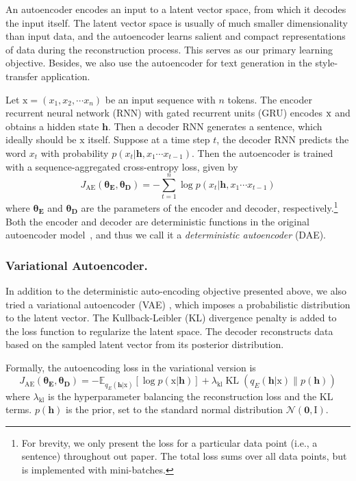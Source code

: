 \documentclass[letterpaper]{article} %
\newcommand{\rmx}{\mathrm x}
\newcommand{\loss}[1]{J_{\text{#1}}}
\newcommand{\hyp}[1]{\lambda_{\text{#1}}}
\newcommand{\nnweight}[1]{\bm{\theta_{\text{#1}}}}
\begin{document}
An autoencoder encodes an input to a latent vector space, from which it decodes the input itself. The latent vector space is usually of much smaller dimensionality than input data, and the autoencoder learns salient and compact representations of data during the reconstruction process.
This serves as our primary learning objective.
Besides, we also use the autoencoder for text generation in the style-transfer application.

Let $\rmx=(x_1, x_2, \cdots x_n)$ be an input sequence with $n$ tokens.
The encoder recurrent neural network (RNN) with gated recurrent units (GRU) \cite{cho2014learning} encodes $\rm x$ and obtains a hidden state $\bm h$.
Then a decoder RNN generates a sentence, which ideally should be $\rmx$ itself.
Suppose at a time step $t$, the decoder RNN predicts the word $x_t$ with probability $p(x_t|\bm h, x_1\cdots x_{t-1})$. Then the autoencoder is trained with a sequence-aggregated cross-entropy loss, given by
\begin{equation}
	\loss{AE}(\nnweight{E},\nnweight{D})= -\sum_{t=1}^n \log p(x_t|\bm h, x_1\cdots x_{t-1})
\end{equation}
where $\nnweight{E}$ and $\nnweight{D}$ are the parameters of the encoder and decoder, respectively.\footnote{For brevity, we only present the loss for a particular data point (i.e., a sentence) throughout out paper. The total loss sums over all data points, but is implemented with mini-batches.} Both the encoder and decoder are deterministic functions in the original autoencoder model~\cite{rumelhart1985learning}, and thus we call it a \textit{deterministic autoencoder} (DAE).

\subsubsection{Variational Autoencoder.}

In addition to the deterministic auto-encoding objective presented above, we also tried a variational autoencoder (VAE) \cite{kingma2013auto}, which imposes a probabilistic distribution to the latent vector. The Kullback-Leibler (KL) divergence \cite{kullback1951information} penalty is added to the loss function to regularize the latent space. The decoder reconstructs data based on the sampled latent vector from its posterior distribution.

Formally, the autoencoding loss in the variational version is
\begin{equation}
	\loss{AE}(\nnweight{E}, \nnweight{D}) =
	- \mathbb{E}_{q_{E}(\bm h|\rmx)} [\log p(\rmx|\bm h)]
	+ \hyp{kl}\operatorname{KL}(q_{E}(\bm h|\rmx)\|p(\bm h))
\end{equation}
where $\hyp{kl}$ is the hyperparameter balancing the reconstruction loss and the KL terms. $p(\bm h)$ is the prior, set to the standard normal distribution $\mathcal{N}(\bm 0,\mathrm I)$.
\end{document}
